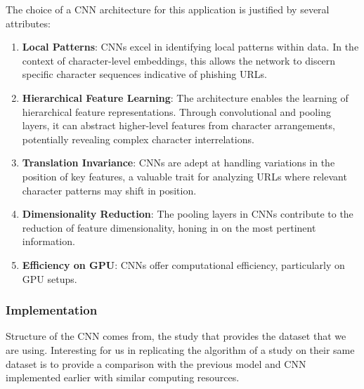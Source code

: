 \documentclass{article}
\begin{document}
    The choice of a CNN architecture for this application is justified by several attributes:
    \begin{enumerate}
        \item \textbf{Local Patterns}: CNNs excel in identifying local patterns within data.
        In the context of character-level embeddings, this allows the network to discern specific character sequences indicative of phishing URLs.
        \item \textbf{Hierarchical Feature Learning}: The architecture enables the learning of hierarchical feature representations.
        Through convolutional and pooling layers, it can abstract higher-level features from character arrangements, potentially revealing complex character interrelations.
        \item \textbf{Translation Invariance}: CNNs are adept at handling variations in the position of key features, a valuable trait for analyzing URLs where relevant character patterns may shift in position.
        \item \textbf{Dimensionality Reduction}: The pooling layers in CNNs contribute to the reduction of feature dimensionality, honing in on the most pertinent information.
        \item \textbf{Efficiency on GPU}: CNNs offer computational efficiency, particularly on GPU setups.
    \end{enumerate}

    \subsubsection{Implementation}
    Structure of the CNN comes from\cite{CharacterLevelCNN}, the study that provides the dataset that we are using.
    Interesting for us in replicating the algorithm of a study on their same dataset is to provide a comparison with the previous model and CNN implemented earlier with similar computing resources.
\end{document}

